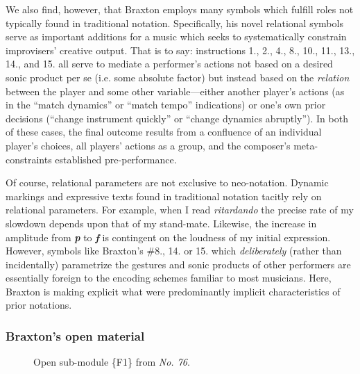        We also find, however, that Braxton employs many symbols which fulfill roles not typically found in traditional notation. Specifically, his novel relational symbols serve as important additions for a music which seeks to systematically constrain improvisers' creative output. That is to say: instructions 1., 2., 4., 8., 10., 11., 13., 14., and 15. all serve to mediate a performer's actions not based on a desired sonic product per se (i.e. some absolute factor) but instead based on the \textit{relation} between the player and some other variable---either another player's actions (as in the ``match dynamics'' or ``match tempo'' indications) or one's own prior decisions (``change instrument quickly'' or ``change dynamics abruptly''). In both of these cases, the final outcome results from a confluence of an individual player's choices, all players' actions as a group, and the composer's meta-constraints established pre-performance.
    
       Of course, relational parameters are not exclusive to neo-notation. Dynamic markings and expressive texts found in traditional notation tacitly rely on relational parameters. For example, when I read \textit{ritardando} the precise rate of my slowdown depends upon that of my stand-mate. Likewise, the increase in amplitude from \textbf{\textit{p}} to \textbf{\textit{f}} is contingent on the loudness of my initial expression. However, symbols like Braxton's \#8., 14. or 15. which \textit{deliberately} (rather than incidentally) parametrize the gestures and sonic products of other performers are essentially foreign to the encoding schemes familiar to most musicians. Here, Braxton is making explicit what were predominantly implicit characteristics of prior notations.
    
    \subsubsection{Braxton's open material}

            \begin{figure} 
                \centering
                \captionsetup{width=.55\textwidth}
                \caption[Open sub-module \{F1\} from \textit{No. 76}.]{Open sub-module \{F1\} from \textit{No. 76}.\footnotemark}
                \label{fig:openf1}
            \end{figure}
            

